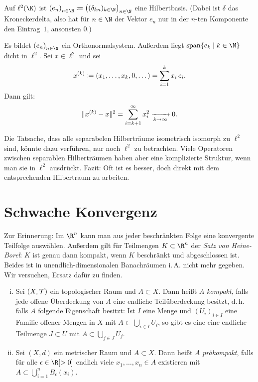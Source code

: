 \nnBemerkung
Auf $\ell^2(\K)$ ist 
$\nSeq e \defeq \bigl((\kron{kn})_{k\in\N}\bigr)_{n\in\N}$
eine Hilbertbasis. (Dabei ist $\delta$ das Kroneckerdelta, also
hat für $n\in\N$ der Vektor $e_n$ nur in der $n$-ten Komponente
den Eintrag~$1$, ansonsten $0$.)

Es bildet $\nSeq e$ ein Orthonormalsystem. Außerdem liegt 
$\spann\{ e_k \Mid k\in\N\}$ dicht in $\ell^2$. Sei $x\in\ell^2$ und
sei
\[ x^{(k)} \defeq (x_1,\dots,x_k,0,\dots) = \isum^k x_i\,e_i  . \]
Dann gilt: 
\[ \norm{x^{(k)} - x}^2 = \isum[k+1]^\infty x_i^2 \Xtoinfty{k} 0
. \]

\nnBemerkung
Die Tatsache, dass alle separabelen Hilberträume isometrisch isomorph zu
$\ell^2$ sind, könnte dazu verführen, nur noch $\ell^2$ zu betrachten. Viele
Operatoren zwischen separablen Hilberträumen haben aber eine komplizierte
Struktur, wenn man sie in $\ell^2$ ausdrückt. Fazit: Oft ist es besser,
doch direkt mit dem entsprechenden Hilbertraum zu arbeiten.


\chapter{Schwache Konvergenz}
Zur Erinnerung: Im $\R^n$ kann man aus jeder beschränkten Folge eine konvergente
Teilfolge auswählen. Außerdem gilt für Teilmengen $K\subset\R^n$ der
\emph{Satz von Heine-Borel}: $K$ ist genau dann kompakt, wenn $K$ beschränkt und
abgeschlossen ist. Beides ist in unendlich-dimensionalen Banachräumen i.\,A.
nicht mehr gegeben. Wir versuchen, Ersatz dafür zu finden.

\begin{thDef}
    \begin{enumerate}[(i)]
        \item
            Sei $(X,\Topo)$ ein topologischer Raum und $A\subset X$.
            Dann heißt $A$ \emph{kompakt}, falls jede offene Überdeckung von
            $A$ eine endliche Teilüberdeckung besitzt, d.\,h. falls $A$ folgende
            Eigenschaft besitzt:
            Ist $I$ eine Menge und $(U_i)_{i\in I}$ eine Familie offener Mengen
            in $X$ mit $A\subset \bigcup_{i\in I} U_i$, so gibt es eine eine
            endliche Teilmenge $J\subset U$ mit $A\subset \bigcup_{j\in J} U_j$.
            
        \item
            Sei $(X,d)$ ein metrischer Raum und $A\subset X$. Dann heißt $A$
            \emph{präkompakt}, falls für alle $\epsilon\in\R[>0]$ endlich viele
            $x_1,\dots,x_n\in A$ existieren mit $A\subset\bigcup_{i=1}^n
            B_\epsilon(x_i)$.
    \end{enumerate}
\end{thDef}

